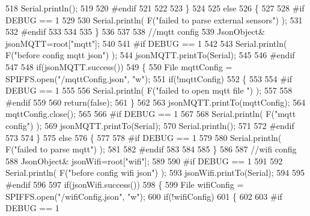 \begin{DoxyCode}
518         Serial.println();
519 
520 \textcolor{preprocessor}{#endif }
521 
522 
523     \}
524 
525     \textcolor{keywordflow}{else}
526     \{   
527 
528 \textcolor{preprocessor}{    #if DEBUG == 1}
529         
530         Serial.println( F(\textcolor{stringliteral}{"failed to parse external sensors"}) );
531 
532 \textcolor{preprocessor}{    #endif}
533 
534 
535     \}
536 
537     
538     \textcolor{comment}{//mqtt config}
539         JsonObject& jsonMQTT=root[\textcolor{stringliteral}{"mqtt"}];
540     
541 \textcolor{preprocessor}{#if DEBUG == 1 }
542 
543     Serial.println( F(\textcolor{stringliteral}{"before config mqtt json"}) );
544     jsonMQTT.printTo(Serial);
545 
546 \textcolor{preprocessor}{#endif}
547 
548     \textcolor{keywordflow}{if}(jsonMQTT.success())
549     \{
550         File mqttConfig = SPIFFS.open(\textcolor{stringliteral}{"/mqttConfig.json"}, \textcolor{stringliteral}{"w"}); 
551         \textcolor{keywordflow}{if}(!mqttConfig)
552         \{
553         
554 \textcolor{preprocessor}{        #if DEBUG == 1 }
555 
556             Serial.println( F(\textcolor{stringliteral}{"failed to open mqtt file "}) );
557         
558 \textcolor{preprocessor}{        #endif}
559         
560             \textcolor{keywordflow}{return}(\textcolor{keyword}{false});
561         \}
562             
563         jsonMQTT.printTo(mqttConfig);
564         mqttConfig.close();
565 
566 \textcolor{preprocessor}{#if DEBUG == 1 }
567 
568         Serial.println( F(\textcolor{stringliteral}{"mqtt config"}) );
569         jsonMQTT.printTo(Serial);
570         Serial.println();
571 
572 \textcolor{preprocessor}{#endif}
573 
574     \}
575     \textcolor{keywordflow}{else}
576     \{
577 
578 \textcolor{preprocessor}{    #if DEBUG == 1 }
579 
580         Serial.println( F(\textcolor{stringliteral}{"failed to parse mqtt"}) );
581     
582 \textcolor{preprocessor}{    #endif}
583 
584     
585     \}   
586 
587     \textcolor{comment}{//wifi config}
588         JsonObject& jsonWifi=root[\textcolor{stringliteral}{"wifi"}];
589     
590 \textcolor{preprocessor}{#if DEBUG == 1 }
591 
592     Serial.println( F(\textcolor{stringliteral}{"before config wifi json"}) );
593     jsonWifi.printTo(Serial);
594 
595 \textcolor{preprocessor}{#endif}
596 
597     \textcolor{keywordflow}{if}(jsonWifi.success())
598     \{
599         File wifiConfig = SPIFFS.open(\textcolor{stringliteral}{"/wifiConfig.json"}, \textcolor{stringliteral}{"w"}); 
600         \textcolor{keywordflow}{if}(!wifiConfig)
601         \{
602         
603 \textcolor{preprocessor}{        #if DEBUG == 1 }

\end{DoxyCode}
